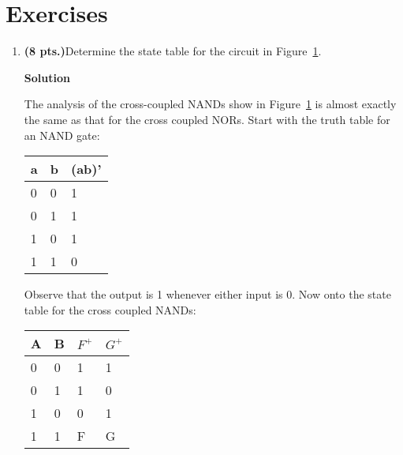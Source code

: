 \section{Exercises}
\label{section:sequentialCircuitsExercises}
\graphicspath{ {./chapter05/FigHw} }

\begin{enumerate}

    \item \textbf{ (8 pts.)}Determine the state table for the circuit in Figure~\ref{fig:sequentialCirNANDs}.
        \begin{figure}[ht]
            \caption{}
            \label{fig:sequentialCirNANDs}
        \end{figure}

        \begin{onlysolution}  \textbf{Solution} \itshape{
                The analysis of the cross-coupled NANDs show in Figure~\ref{fig:sequentialCirNANDs} is
                almost exactly the same as that for the cross coupled NORs.  Start with
                the truth table for an NAND gate:

                \begin{tabular}{l|l||l}
                    a & b & (ab)' \\ \hline
                    0 & 0 & 1 \\ \hline
                    0 & 1 & 1 \\ \hline
                    1 & 0 & 1 \\ \hline
                    1 & 1 & 0 \\
                \end{tabular}

                Observe that the output is 1 whenever
                either input is 0.  Now onto the state table for the cross coupled NANDs:

                \begin{tabular}{l|l||l|l}
                    A & B & $F^+$ & $G^+$ \\ \hline
                    0 & 0 & 1 & 1 \\ \hline
                    0 & 1 & 1 & 0 \\ \hline
                    1 & 0 & 0 & 1 \\ \hline
                    1 & 1 & F & G \\
                \end{tabular}

}
\end{onlysolution}
\end{enumerate}
